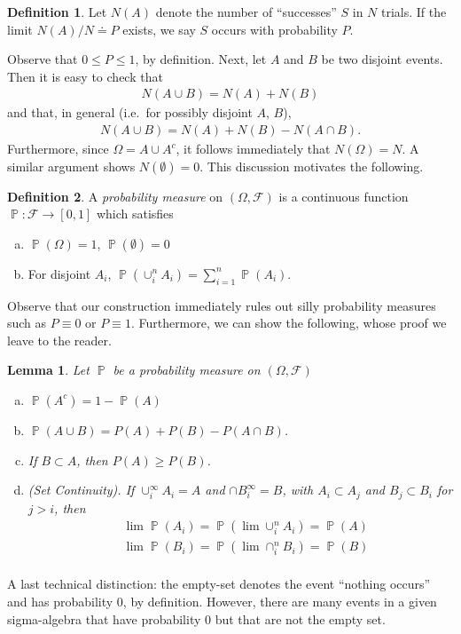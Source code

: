 \documentclass[12pt]{article}
\newcommand{\filter}{\mathcal{F}}
\DeclareMathOperator{\prob}{\mathbb{P}}
\theoremstyle{plain}
\newtheorem{lemma}[theorem]{Lemma}
\theoremstyle{definition}
\newtheorem*{definition}{Definition}
\theoremstyle{remark}
\numberwithin{equation}{section}  %
\begin{document}
\begin{definition}
	Let $N(A)$ denote the number of ``successes'' $S$ in $N$ trials. If the
	limit $N(A)/N \doteq P$ exists, we say $S$ occurs with probability $P$.
\end{definition}
Observe that $ 0 \le P \le 1$, by definition.
Next, let $A$ and $B$ be two disjoint events. Then
it is easy to check that
\begin{align*}
	N(A \cup B) = N(A) + N(B)
\end{align*}
and that, in general (i.e.\ for possibly disjoint $A$, $B$),
\begin{align*}
	N(A \cup B) = N(A) + N(B) - N(A \cap B).
\end{align*}
Furthermore, since $\Omega = A \cup A^c$, it follows immediately
that $N(\Omega) = N$. A similar argument shows $N(\emptyset) = 0$.
This discussion motivates the following.
\begin{definition}
	A \emph{probability measure} on $(\Omega, \filter)$ is a continuous function
	$\prob: \filter \to [0,1]$ which satisfies
	\begin{enumerate}[(a)]
		\item
			$\prob(\Omega) = 1$, $\prob(\emptyset) = 0$
		\item
			For disjoint $A_i$, $\prob(\cup_i^n A_i) = \sum_{i = 1}^n 
			\prob(A_i)$.
	\end{enumerate}
\end{definition}
Observe that our construction immediately rules out silly probability
measures such as $P \equiv 0$ or $P \equiv 1$. Furthermore,
we can show the following, whose proof we leave to the reader.
\begin{lemma}
	Let $\prob$ be a probability measure on $(\Omega, \filter)$
	\begin{enumerate}[(a)]
		\item $\prob(A^c) = 1 - \prob(A)$
		\item $\prob(A \cup B) = P(A) + P(B) - P(A \cap B)$.
		\item If $B \subset A$, then $P(A) \ge P(B)$.
		\item \emph{(Set Continuity)}.
			If $\cup_i^\infty A_i = A$ and
			$\cap B_i^\infty = B$, with $A_i \subset A_j$ and $B_j \subset B_i$ 
			for $j > i$,
			then
			\begin{align*}
				& \lim \prob(A_i) = \prob(\lim \cup_i^n A_i) = \prob(A) \\
				& \lim \prob(B_i) = \prob(\lim \cap_i^n B_i) = \prob(B) \\
			\end{align*}
	\end{enumerate}
\end{lemma}
A last technical distinction: the empty-set denotes the event ``nothing
occurs'' and has probability $0$, by definition. However, there are many
events in a given sigma-algebra that have probability $0$ but that are not the
empty set.
\end{document}
